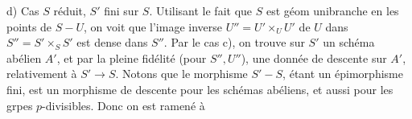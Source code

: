 d) Cas $S$ réduit, \unsure{(}$S'$ fini sur $S$. Utilisant le fait que $S$ est géom unibranche en les points de $S-U$, on voit que l'image inverse $U''=U'\times_U U'$ de $U$ dans $S''=S'\times_S S'$ est dense dans $S''$.
Par le cas c), on trouve sur $S'$ un schéma abélien $A'$, et par la pleine fidélité (pour $S'',U''$), une donnée de descente sur $A'$, relativement à $S'\to S$. Notons que le morphisme $S'\mathbin{-}S$, étant un épimorphisme fini, est un morphisme de descente pour les schémas abéliens,  et aussi pour les grpes $p$-divisibles. Donc on est ramené à

